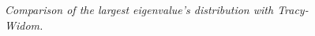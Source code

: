 \documentclass{article}
\begin{document}
\begin{figure}[htb!]
  \centering
  \caption{\small \it Comparison of the largest eigenvalue's
    distribution with Tracy-Widom.}
  \label{fig:eig1_TW}
\end{figure}
\end{document}

